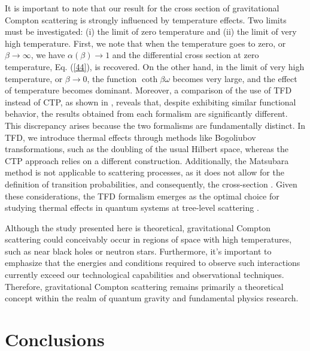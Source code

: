 \documentclass[11pt,showpacs,preprintnumbers,amsmath,amssymb,prd,nofootinbib,superscriptaddress]{revtex4-2}
\begin{document}
It is important to note that our result for the cross section of gravitational Compton scattering is strongly influenced by temperature effects. Two limits must be investigated: (i) the limit of zero temperature and (ii) the limit of very high temperature. First, we note that when the temperature goes to zero, or $\beta\rightarrow \infty$, we have
$\alpha(\beta)\rightarrow 1$
and the differential cross section at zero temperature, Eq. (\ref{44}), is recovered. On the other hand, in the limit of very high temperature, or  $\beta\rightarrow 0$, the function $\coth{\beta\omega}$ becomes very large, and the effect of temperature becomes dominant. Moreover, a comparison of the use of TFD instead of CTP, as shown in \cite{cabral}, reveals that, despite exhibiting similar functional behavior, the results obtained from each formalism are significantly different. This discrepancy arises because the two formalisms are fundamentally distinct. In TFD, we introduce thermal effects through methods like Bogoliubov transformations, such as the doubling of the usual Hilbert space, whereas the CTP approach relies on a different construction. Additionally, the Matsubara method is not applicable to scattering processes, as it does not allow for the definition of transition probabilities, and consequently, the cross-section \cite{xu1995compton}. Given these considerations, the TFD formalism emerges as the optimal choice for studying thermal effects in quantum systems at tree-level scattering \cite{das2023finite}.

Although the study presented here is theoretical, gravitational Compton scattering could conceivably occur in regions of space with high temperatures, such as near black holes or neutron stars. Furthermore, it's important to emphasize that the energies and conditions required to observe such interactions currently exceed our technological capabilities and observational techniques. Therefore, gravitational Compton scattering remains primarily a theoretical concept within the realm of quantum gravity and fundamental physics research.



\section{Conclusions}\label{V}
\end{document}
